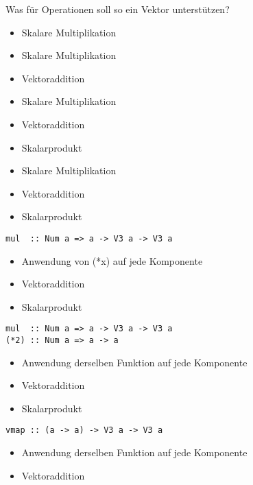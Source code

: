 \documentclass{beamer}
\begin{document}
\begin{frame}[fragile]
Was für Operationen soll so ein Vektor unterstützen?
\pause
\begin{overprint}
\begin{itemize}
 \item Skalare Multiplikation
\end{itemize}
\begin{itemize}
 \item Skalare Multiplikation
 \item Vektoraddition
\end{itemize}
\begin{itemize}
 \item Skalare Multiplikation
 \item Vektoraddition
 \item Skalarprodukt
\end{itemize}
\begin{itemize}
 \item Skalare Multiplikation
 \item Vektoraddition
 \item Skalarprodukt
\end{itemize}
\begin{verbatim}
mul  :: Num a => a -> V3 a -> V3 a
\end{verbatim}
\begin{itemize}
 \item Anwendung von (*x) auf jede Komponente
 \item Vektoraddition
 \item Skalarprodukt
\end{itemize}
\begin{verbatim}
mul  :: Num a => a -> V3 a -> V3 a
(*2) :: Num a => a -> a
\end{verbatim}
\begin{itemize}
 \item Anwendung derselben Funktion auf jede Komponente
 \item Vektoraddition
 \item Skalarprodukt
\end{itemize}
\begin{verbatim}
vmap :: (a -> a) -> V3 a -> V3 a
\end{verbatim}
\begin{itemize}
 \item Anwendung derselben Funktion auf jede Komponente
 \item Vektoraddition

\end{itemize}
\end{overprint}
\end{frame}
\end{document}
